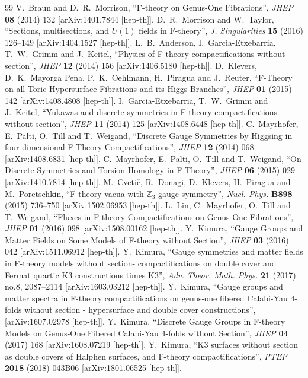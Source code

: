 \documentclass[12pt]{article}
\begin{document}
\begin{thebibliography}{99}
V.~Braun and D.~R.~Morrison, ``F-theory on Genus-One Fibrations'', {\it JHEP} {\bf 08} (2014) 132 [arXiv:1401.7844 [hep-th]].
D.~R.~Morrison and W.~Taylor, ``Sections, multisections, and $U(1)$ fields in F-theory'', {\it J. Singularities} {\bf 15} (2016) 126--149 [arXiv:1404.1527 [hep-th]].
L.~B.~Anderson, I.~Garcia-Etxebarria, T.~W.~Grimm and J.~Keitel, ``Physics of F-theory compactifications without section'', {\it JHEP} {\bf 12} (2014) 156 [arXiv:1406.5180 [hep-th]].
D.~Klevers, D.~K.~Mayorga Pena, P.~K.~Oehlmann, H.~Piragua and J.~Reuter, ``F-Theory on all Toric Hypersurface Fibrations and its Higgs Branches'', {\it JHEP} {\bf 01} (2015) 142 [arXiv:1408.4808 [hep-th]].
I.~Garcia-Etxebarria, T.~W.~Grimm and J.~Keitel, ``Yukawas and discrete symmetries in F-theory compactifications without section'', {\it JHEP} {\bf 11} (2014) 125 [arXiv:1408.6448 [hep-th]].
C.~Mayrhofer, E.~Palti, O.~Till and T.~Weigand, ``Discrete Gauge Symmetries by Higgsing in four-dimensional F-Theory Compactifications'', {\it JHEP} {\bf 12} (2014) 068 [arXiv:1408.6831 [hep-th]].
C.~Mayrhofer, E.~Palti, O.~Till and T.~Weigand, ``On Discrete Symmetries and Torsion Homology in F-Theory'', {\it JHEP} {\bf 06} (2015) 029 [arXiv:1410.7814 [hep-th]].
M.~Cveti\v c, R.~Donagi, D.~Klevers, H.~Piragua and M.~Poretschkin, ``F-theory vacua with $\mathbb Z_3$ gauge symmetry'', {\it Nucl. Phys.} {\bf B898} (2015) 736--750 [arXiv:1502.06953 [hep-th]].
L.~Lin, C.~Mayrhofer, O.~Till and T.~Weigand, ``Fluxes in F-theory Compactifications on Genus-One Fibrations'', {\it JHEP} {\bf 01} (2016) 098 [arXiv:1508.00162 [hep-th]].
Y.~Kimura, ``Gauge Groups and Matter Fields on Some Models of F-theory without Section'', {\it JHEP} {\bf 03} (2016) 042 [arXiv:1511.06912 [hep-th]].
Y.~Kimura, ``Gauge symmetries and matter fields in F-theory models without section- compactifications on double cover and Fermat quartic K3 constructions times K3'', {\it Adv. Theor. Math. Phys.} {\bf 21} (2017) no.8, 2087--2114 [arXiv:1603.03212 [hep-th]].
Y.~Kimura, ``Gauge groups and matter spectra in F-theory compactifications on genus-one fibered Calabi-Yau 4-folds without section - hypersurface and double cover constructions'', [arXiv:1607.02978 [hep-th]]. 
Y.~Kimura, ``Discrete Gauge Groups in F-theory Models on Genus-One Fibered Calabi-Yau 4-folds without Section'', {\it JHEP} {\bf 04} (2017) 168 [arXiv:1608.07219 [hep-th]].
Y.~Kimura, ``K3 surfaces without section as double covers of Halphen surfaces, and F-theory compactifications'', {\it PTEP} {\bf 2018} (2018) 043B06 [arXiv:1801.06525 [hep-th]].


\end{thebibliography}
\end{document}
